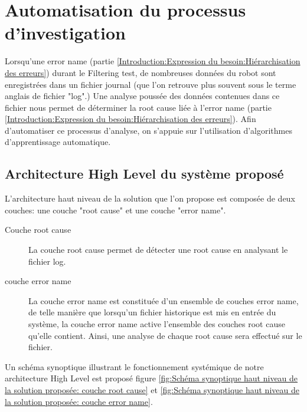 \chapter{Automatisation du processus d'investigation}
\label{Automatisation du processus d'investigation}
\thispagestyle{fancy}
Lorsqu'une error name (partie \ref{Introduction:Expression du besoin:Hiérarchisation des erreurs}) durant le Filtering test, de nombreuses données du robot sont enregistrées dans un fichier journal (que l'on retrouve plus souvent sous le terme anglais de fichier "log".) Une analyse poussée des données contenues dans ce fichier nous permet de déterminer la root cause liée à l'error name (partie \ref{Introduction:Expression du besoin:Hiérarchisation des erreurs}). Afin d'automatiser ce processus d'analyse, on s'appuie sur l'utilisation d'algorithmes d'apprentissage automatique. 

\section{Architecture High Level du système proposé}
\label{Automatisation du processus d'investigation: Achitecture High Level du système proposé}
L'architecture haut niveau de la solution que l'on propose est composée de deux couches: une couche "root cause" et une couche "error name".
\begin{description}
	\item [Couche root cause] La couche root cause permet de détecter une root cause en analysant le fichier log.
	\item [couche error name] La couche error name est constituée d'un ensemble de couches error name, de telle manière que lorsqu'un fichier historique est mis en entrée du système, la couche error name active l'ensemble des couches root cause qu'elle contient. Ainsi, une analyse de chaque root cause sera effectué sur le fichier.
\end{description} 

Un schéma synoptique illustrant le fonctionnement systémique de notre architecture High Level est proposé figure \ref{fig:Schéma synoptique haut niveau de la solution proposée: couche root cause} et \ref{fig:Schéma synoptique haut niveau de la solution proposée: couche error name}.


